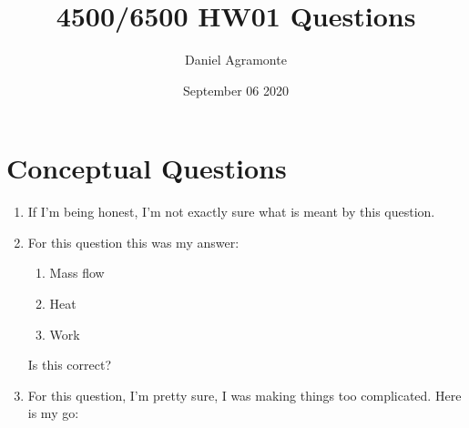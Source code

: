 \documentclass{article}
\title{4500/6500 HW01 Questions}
\author{Daniel Agramonte}
\date{September 06 2020}
\newcommand\setItemnumber[1]{\setcounter{enumi}{\numexpr#1-1\relax}}
\begin{document}
\maketitle

\section{Conceptual Questions}
\begin{enumerate}
    \setItemnumber{1}
    \item If I'm being honest, I'm not exactly sure what is meant by this question.
    \setItemnumber{5}
    \item For this question this was my answer:
    \begin{enumerate}
        \item Mass flow
        \item Heat
        \item Work
    \end{enumerate}
    Is this correct?
    \setItemnumber{11}
    \item For this question, I'm pretty sure, I was making things too complicated. Here is my go:
    

\end{enumerate}
\end{document}
